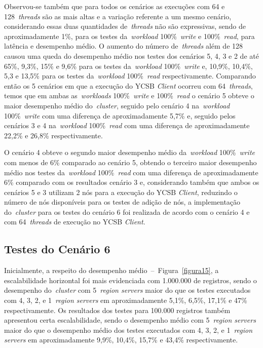 \documentclass[12pt]{article}
\begin{document}
Observou-se também que para todos os cenários as execuções com 64 e 128~\emph{threads} são as mais altas e a variação referente a um mesmo cenário, considerando essas duas quantidades de~\emph{threads} não são expressivas, sendo de aproximadamente 1\%, para os testes da~\emph{workload} 100\%~\emph{write} e 100\%~\emph{read}, para latência e desempenho médio. 
O aumento do número de~\emph{threads} além de 128 causou uma queda do desempenho médio nos testes dos cenários 5, 4, 3 e 2 de até 65\%, 9,3\%, 15\% e 9,6\% para os testes da~\emph{workload} 100\%~\emph{write} e, 10,9\%, 10,4\%, 5,3 e 13,5\% para os testes da~\emph{workload} 100\%~\emph{read} respectivamente. Comparando então os 5 cenários em que a execução do YCSB \emph{Client} ocorreu com 64~\emph{threads}, temos que em ambas as~\emph{workloads} 100\%~\emph{write} e 100\%~\emph{read} o cenário 5 obteve o maior desempenho médio do~\emph{cluster}, seguido pelo cenário 4 na~\emph{workload} 100\%~\emph{write} com uma diferença de aproximadamente 5,7\% e, seguido pelos cenários 3 e 4 na~\emph{workload} 100\%~\emph{read} com uma diferença de aproximadamente 22,2\% e 26,8\% respectivamente.

O cenário 4 obteve o segundo maior desempenho médio da~\emph{workload} 100\%~\emph{write} com menos de 6\% comparado ao cenário 5, obtendo o terceiro maior desempenho médio nos testes da~\emph{workload} 100\%~\emph{read} com uma diferença de aproximadamente 6\% comparado com os resultados cenário 3 e, considerando também que ambos os cenários 5 e 3 utilizam 2 nós para a execução do YCSB \emph{Client}, reduzindo o número de nós disponíveis para os testes de adição de nós, a implementação do~\emph{cluster} para os testes do cenário 6 foi realizada de acordo com o cenário 4 e com 64~\emph{threads} de execução no YCSB \emph{Client}.

\subsection{Testes do Cenário 6}
\label{subsec:resultado-cenario-6}

Inicialmente, a respeito do desempenho médio~--~Figura~\ref{figura15}, a escalabilidade horizontal foi mais evidenciada com 1.000.000 de registros, sendo o desempenho do~\emph{cluster} com 5~\emph{region servers} maior do que os testes executados com 4, 3, 2, e 1~\emph{region servers} em aproximadamente 5,1\%, 6,5\%, 17,1\% e 47\% respectivamente. 
Os resultados dos testes para 100.000 registros também apresentou certa escalabilidade, sendo o desempenho médio com 5~\emph{region servers} maior do que o desempenho médio dos testes executados com 4, 3, 2, e 1~\emph{region servers} em aproximadamente 9,9\%, 10,4\%, 15,7\% e 43,4\% respectivamente.
\end{document}

